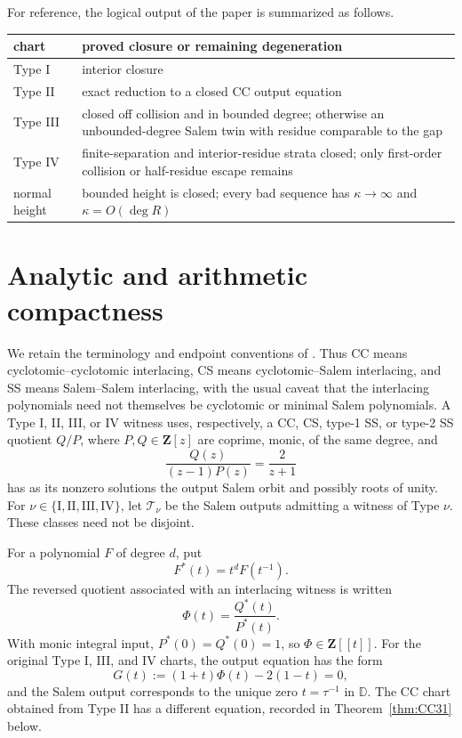 \documentclass[11pt,reqno]{amsart}
\theoremstyle{definition}
\theoremstyle{remark}
\newcommand{\D}{\mathbb D}
\newcommand{\Z}{\mathbf Z}
\newcommand{\calT}{\mathcal T}
\begin{document}
For reference, the logical output of the paper is summarized as follows.
\begin{center}
\footnotesize
\begin{tabular}{@{}p{}p{}@{}}
\toprule
chart & proved closure or remaining degeneration\\
\midrule
Type I & interior closure\\
Type II & exact reduction to a closed CC output equation\\
Type III & closed off collision and in bounded degree; otherwise an
unbounded-degree Salem twin with residue comparable to the gap\\
Type IV & finite-separation and interior-residue strata closed; only
first-order collision or half-residue escape remains\\
normal height & bounded height is closed; every bad sequence has
$\kappa\to\infty$ and $\kappa=O(\deg R)$\\
\bottomrule
\end{tabular}
\end{center}

\section{Analytic and arithmetic compactness}

We retain the terminology and endpoint conventions of
\cite[Secs.~2.2--2.5 and Thm.~7.3]{mckeesmyth}.  Thus CC means
cyclotomic--cyclotomic interlacing, CS means cyclotomic--Salem interlacing,
and SS means Salem--Salem interlacing, with the usual caveat that the
interlacing polynomials need not themselves be cyclotomic or minimal Salem
polynomials.  A Type I, II, III, or IV witness uses, respectively, a CC, CS,
type-1 SS, or type-2 SS quotient $Q/P$, where $P,Q\in\Z[z]$ are coprime,
monic, of the same degree, and
\begin{equation}\label{eq:witness}
 \frac{Q(z)}{(z-1)P(z)}=\frac2{z+1}
\end{equation}
has as its nonzero solutions the output Salem orbit and possibly roots of
unity.  For $\nu\in\{\mathrm I,\mathrm{II},\mathrm{III},\mathrm{IV}\}$,
let $\calT_\nu$ be the Salem outputs admitting a witness of Type $\nu$.
These classes need not be disjoint.

For a polynomial $F$ of degree $d$, put
\[
 F^*(t)=t^dF(t^{-1}).
\]
The reversed quotient associated with an interlacing witness is written
\begin{equation}\label{eq:Phi}
 \Phi(t)=\frac{Q^*(t)}{P^*(t)}.
\end{equation}
With monic integral input, $P^*(0)=Q^*(0)=1$, so $\Phi\in\Z[[t]]$.
For the original Type I, III, and IV charts, the output equation has the form
\begin{equation}\label{eq:output}
 G(t):=(1+t)\Phi(t)-2(1-t)=0,
\end{equation}
and the Salem output corresponds to the unique zero $t=\tau^{-1}$ in $\D$.
The CC chart obtained from Type II has a different equation, recorded in
Theorem~\ref{thm:CC31} below.
\end{document}

